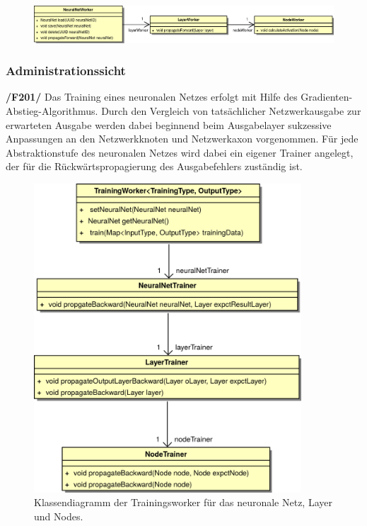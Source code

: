 \begin{figure}[H]
\begin{center}
\includegraphics[width=\textwidth]{Abbildungen/UML/uml_ronny/workerKlassenDiagramm.png}
\end{center}
\end{figure}

\subsubsection{Administrationssicht}

\textbf{/F201/} Das Training eines neuronalen Netzes erfolgt mit Hilfe des Gradienten-Abstieg-Algorithmus. Durch den Vergleich von tatsächlicher Netzwerkausgabe zur erwarteten Ausgabe werden dabei beginnend beim Ausgabelayer sukzessive Anpassungen an den Netzwerkknoten und Netzwerkaxon vorgenommen. Für jede Abstraktionstufe des neuronalen Netzes wird dabei ein eigener Trainer angelegt, der für die Rückwärtspropagierung des Ausgabefehlers zuständig ist.\\[-0.5cm]
\begin{figure}[H]
\begin{center}
\includegraphics[width=10cm]{Abbildungen/UML/jan/trainerCD.png}
\caption{Klassendiagramm der Trainingsworker für das neuronale Netz, Layer und Nodes.}
\label{fig_cdTraining}
\end{center}
\end{figure}
